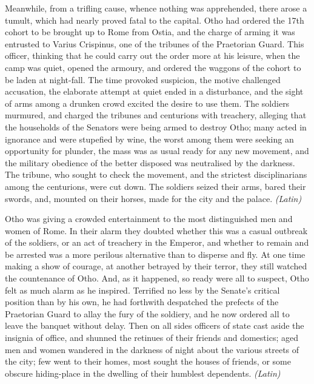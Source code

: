 Meanwhile, from a trifling cause, whence nothing was apprehended, there arose a tumult, which had nearly proved fatal to the capital. Otho had ordered the 17th cohort to be brought up to Rome from Ostia, and the charge of arming it was entrusted to Varius Crispinus, one of the tribunes of the Praetorian Guard. This officer, thinking that he could carry out the order more at his leisure, when the camp was quiet, opened the armoury, and ordered the waggons of the cohort to be laden at night-fall. The time provoked suspicion, the motive challenged accusation, the elaborate attempt at quiet ended in a disturbance, and the sight of arms among a drunken crowd excited the desire to use them. The soldiers murmured, and charged the tribunes and centurions with treachery, alleging that the households of the Senators were being armed to destroy Otho; many acted in ignorance and were stupefied by wine, the worst among them were seeking an opportunity for plunder, the mass was as usual ready for any new movement, and the military obedience of the better disposed was neutralised by the darkness. The tribune, who sought to check the movement, and the strictest disciplinarians among the centurions, were cut down. The soldiers seized their arms, bared their swords, and, mounted on their horses, made for the city and the palace. \emph{(Latin)}


Otho was giving a crowded entertainment to the most distinguished men and women of Rome. In their alarm they doubted whether this was a casual outbreak of the soldiers, or an act of treachery in the Emperor, and whether to remain and be arrested was a more perilous alternative than to disperse and fly. At one time making a show of courage, at another betrayed by their terror, they still watched the countenance of Otho. And, as it happened, so ready were all to suspect, Otho felt as much alarm as he inspired. Terrified no less by the Senate's critical position than by his own, he had forthwith despatched the prefects of the Praetorian Guard to allay the fury of the soldiery, and he now ordered all to leave the banquet without delay. Then on all sides officers of state cast aside the insignia of office, and shunned the retinues of their friends and domestics; aged men and women wandered in the darkness of night about the various streets of the city; few went to their homes, most sought the houses of friends, or some obscure hiding-place in the dwelling of their humblest dependents. \emph{(Latin)}


